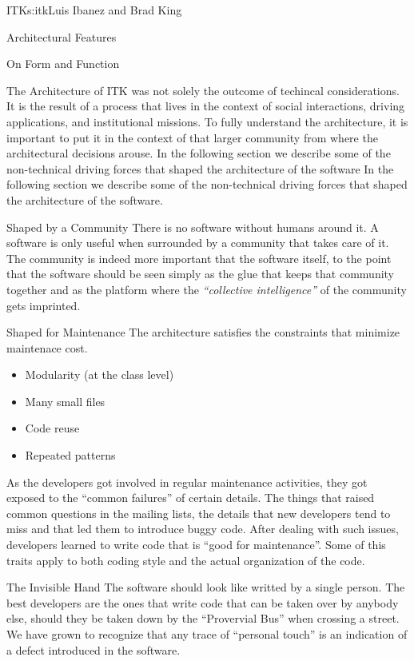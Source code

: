 \begin{aosachapter}{ITK}{s:itk}{Luis Ibanez and Brad King}
\begin{aosasect1}{Architectural Features}
\end{aosasect1}

\begin{aosasect1}{On Form and Function}

The Architecture of ITK was not solely the outcome of techincal
considerations. It is the result of a process that lives in the
context of social interactions, driving applications, and
institutional missions. To fully understand the architecture, it is
important to put it in the context of that larger community from where
the architectural decisions arouse. In the following section we
describe some of the non-technical driving forces that shaped the
architecture of the software In the following section we describe some
of the non-technical driving forces that shaped the architecture of
the software.

\begin{aosasect2}{Shaped by a Community}
There is no software without humans around it. A software is only
useful when surrounded by a community that takes care of it. The
community is indeed more important that the software itself, to the
point that the software should be seen simply as the glue that keeps
that community together and as the platform where the \emph{``collective
intelligence''} of the community gets imprinted.
\end{aosasect2}

\begin{aosasect2}{Shaped for Maintenance}
The architecture satisfies the constraints that minimize maintenace cost.
\begin{itemize}
\item Modularity (at the class level)
\item Many small files
\item Code reuse
\item Repeated patterns
\end{itemize}
\end{aosasect2}
As the developers got involved in regular maintenance activities, they
got exposed to the ``common failures'' of certain details. The things
that raised common questions in the mailing lists, the details that
new developers tend to miss and that led them to introduce buggy code.
After dealing with such issues, developers learned to write code that
is ``good for maintenance''. Some of this traits apply to both coding
style and the actual organization of the code.

\begin{aosasect2}{The Invisible Hand}
The software should look like writted by a single person. The best
developers are the ones that write code that can be taken over by
anybody else, should they be taken down by the ``Provervial Bus'' when
crossing a street. We have grown to recognize that any trace of
``personal touch'' is an indication of a defect introduced in the
software.
\end{aosasect2}


\end{aosasect1}
\end{aosachapter}
